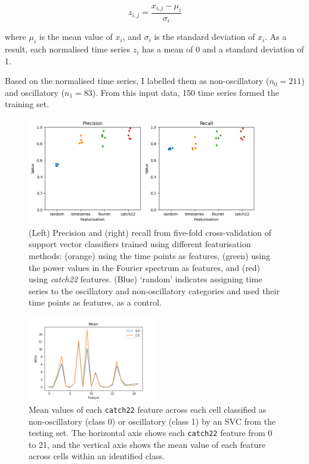 \begin{equation}
  z_{i,j} = \frac{x_{i,j} - \mu_{i}}{\sigma_{i}}
  \label{eq:analysis-stdscore}
\end{equation}

where $\mu_{i}$ is the mean value of $x_{i}$, and $\sigma_{i}$ is the standard deviation of $x_{i}$.
As a result, each normalised time series $z_{i}$ has a mean of 0 and a standard deviation of 1.

Based on the normalised time series, I labelled them as non-oscillatory ($n_{0}=211$) and oscillatory ($n_{1}=83$).
From this input data, 150 time series formed the training set.

\begin{figure}
  \centering
  \includegraphics[width=0.9\textwidth]{precision_recall}
  \caption[
  ]{
    (Left) Precision and (right) recall from five-fold cross-validation of support vector classifiers trained using different featurisation methods:
    (orange) using the time points as features,
    (green) using the power values in the Fourier spectrum as features,
    and (red) using \emph{catch22} features.
    (Blue) `random' indicates assigning time series to the oscillatory and non-oscillatory categories and used their time points as features, as a control.
  }
  \label{fig:analysis-precision-recall}
\end{figure}

\begin{figure}
  \centering
  \includegraphics[width=0.5\textwidth]{catch22_training_featurevector_mean}
  \caption[
    Mean values of each \texttt{catch22} feature across each cell
  ]{
    Mean values of each \texttt{catch22} feature across each cell classified as non-oscillatory (class 0) or oscillatory (class 1) by an SVC from the testing set.
    The horizontal axis shows each \texttt{catch22} feature from 0 to 21, and the vertical axis shows the mean value of each feature across cells within an identified class.
  }
  \label{fig:analysis-svc-catch22}
\end{figure}


